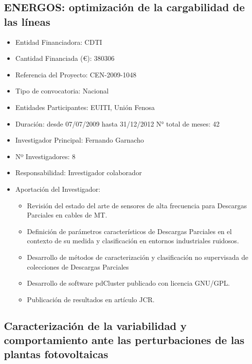\documentclass[article, a4paper]{memoir}
\begin{document}
\subsection{ENERGOS: optimización de la cargabilidad de las líneas}
\label{sec:orgheadline32}

\begin{itemize}
\item Entidad Financiadora: CDTI
\item Cantidad Financiada (€): 380306
\item Referencia del Proyecto: CEN-2009-1048
\item Tipo de convocatoria: Nacional
\item Entidades Participantes: EUITI, Unión Fenosa
\item Duración: desde 07/07/2009 hasta 31/12/2012 N° total de meses: 42
\item Investigador Principal: Fernando Garnacho
\item Nº Investigadores: 8
\item Responsabilidad: Investigador colaborador
\item Aportación del Investigador:
\begin{itemize}
\item Revisión del estado del arte de sensores de alta frecuencia para Descargas Parciales en cables de MT.
\item Definición de parámetros característicos de Descargas Parciales en el contexto de su medida y clasificación en entornos industriales ruidosos.
\item Desarrollo de métodos de caracterización y clasificación no supervisada de colecciones de Descargas Parciales
\item Desarrollo de software pdCluster publicado con licencia GNU/GPL.
\item Publicación de resultados en artículo JCR.
\end{itemize}
\end{itemize}

\subsection{Caracterización de la variabilidad y comportamiento ante las perturbaciones de las plantas fotovoltaicas}
\label{sec:orgheadline33}
\end{document}
